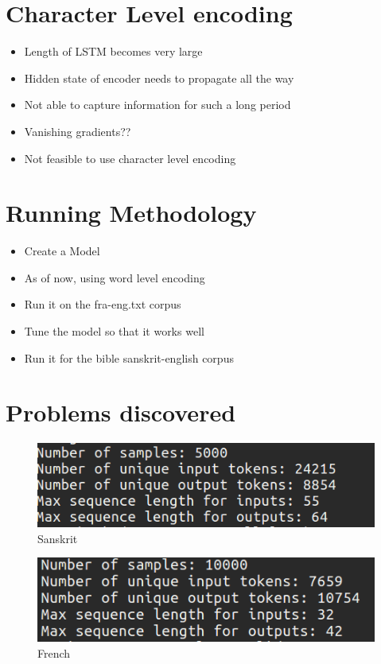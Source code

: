 \documentclass[11pt]{article}
\begin{document}
\section{Character Level encoding}
\begin{itemize}
	\item Length of LSTM becomes very large
	\item Hidden state of encoder needs to propagate all the way
	\item Not able to capture information for such a long period
	\item Vanishing gradients??
	\item Not feasible to use character level encoding
\end{itemize}

\section{Running Methodology}
\begin{itemize}
					
	\item Create a Model
	\item As of now, using word level encoding
	\item Run it on the fra-eng.txt corpus
	\item Tune the model so that it works well
	\item Run it for the bible sanskrit-english corpus
	      	      	      	      	      
\end{itemize}

\section{Problems discovered}
\begin{figure}[H]
	\includegraphics[scale=0.5]{Screenshot_from_2018-04-02_09-31-27.png}
	\caption{Sanskrit}
\end{figure}    
\begin{figure}[H]
	\includegraphics[scale=0.5]{Screenshot_from_2018-04-02_09-32-22.png}
	\caption{French}
\end{figure}
\end{document}
